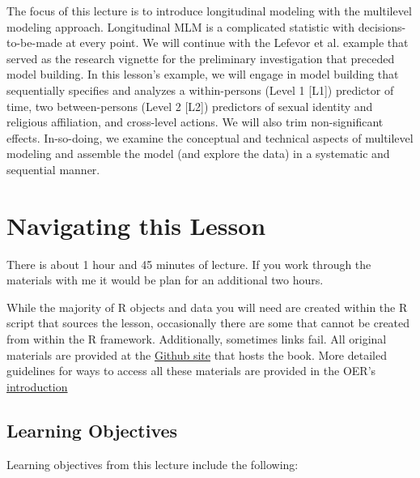 \documentclass[
  english,
]{book}
\begin{document}
The focus of this lecture is to introduce longitudinal modeling with the multilevel modeling approach. Longitudinal MLM is a complicated statistic with decisions-to-be-made at every point. We will continue with the Lefevor et al. \citeyearpar{lefevor_religious_2017} example that served as the research vignette for the preliminary investigation that preceded model building. In this lesson's example, we will engage in model building that sequentially specifies and analyzes a within-persons (Level 1 {[}L1{]}) predictor of time, two between-persons (Level 2 {[}L2{]}) predictors of sexual identity and religious affiliation, and cross-level actions. We will also trim non-significant effects. In-so-doing, we examine the conceptual and technical aspects of multilevel modeling and assemble the model (and explore the data) in a systematic and sequential manner.

\hypertarget{navigating-this-lesson-2}{%
\section{Navigating this Lesson}\label{navigating-this-lesson-2}}

There is about 1 hour and 45 minutes of lecture. If you work through the materials with me it would be plan for an additional two hours.

While the majority of R objects and data you will need are created within the R script that sources the lesson, occasionally there are some that cannot be created from within the R framework. Additionally, sometimes links fail. All original materials are provided at the \href{https://github.com/lhbikos/ReC_CPA}{Github site} that hosts the book. More detailed guidelines for ways to access all these materials are provided in the OER's \protect\hyperlink{ReCintro}{introduction}

\hypertarget{learning-objectives-2}{%
\subsection{Learning Objectives}\label{learning-objectives-2}}

Learning objectives from this lecture include the following:
\end{document}
